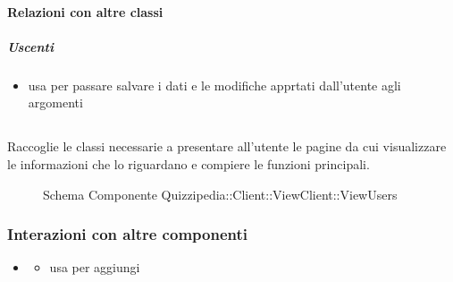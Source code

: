 \paragraph{Relazioni con altre classi}
\subparagraph{Uscenti}
\begin{itemize}
\item usa  per passare salvare i dati e le modifiche apprtati dall'utente agli argomenti
\end{itemize}
\subsection{}
Raccoglie le classi necessarie a presentare all'utente le pagine da cui visualizzare le informazioni che lo riguardano e compiere le funzioni principali.
\begin{figure}[H]
\centering
\noindent{}
\caption[Schema Componente Quizzipedia::Client::ViewClient::ViewUsers]{Schema Componente Quizzipedia::Client::ViewClient::ViewUsers}
\end{figure}
\subsubsection{Interazioni con altre componenti}
\begin{itemize}
\item {}
\begin{itemize}
\item usa  per aggiungi
\end{itemize}
\end{itemize}
